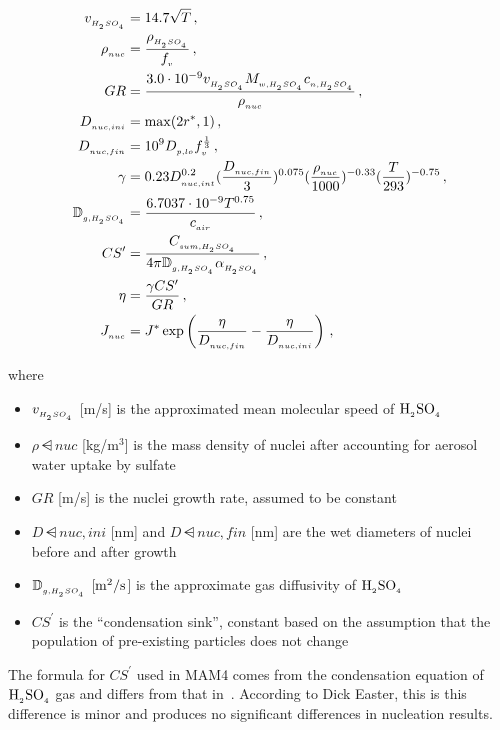 \begin{align}
  v\dsub{\sag} &= 14.7 \sqrt{T} \,, \\
  \rho\dsub{nuc} &= \frac{\rho\dsub{\sag}}{f\dsub{v}} \,, \\
  GR &= \frac{3.0 \cdot 10^{-9} v\dsub{\sag} \mw{\sag} c\dsub{n,\sag}}
        {\rho\dsub{nuc}} \,, \\
  D\dsub{nuc,ini} &= \max (2r^*, 1) \,, \\
  D\dsub{nuc,fin} &= 10^9 D\dsub{p,lo} f\dsub{v}^{\frac{1}{3}} \,, \\
  \gamma &= 0.23 D\dsub{nuc,int}^{0.2}
                 (\frac{D\dsub{nuc,fin}}{3})^{0.075}
                 (\frac{\rho\dsub{nuc}}{1000})^{-0.33}
                 (\frac{T}{293})^{-0.75} \,, \labeleq{nuc:gamma} \\
  \mathbb{D}\dsub{g,\sag} &= \frac{6.7037 \cdot 10^{-9} T^{0.75}}
                             {c\dsub{air}} \,, \\
  CS^\prime &= \frac{C\dsub{sum,\sag}}
               {4 \pi \mathbb{D}\dsub{g,\sag} \alpha\dsub{\sag}} \,, \label{eq:cs_prime} \\
  \eta &= \frac{\gamma CS^\prime}{GR} \,, \\
  J\dsub{nuc} &= J^* \exp \left( \frac{\eta}{D\dsub{nuc,fin}} -
                     \frac{\eta}{D\dsub{nuc,ini}} \right) \,,
\end{align}

where
\begin{itemize}
  \item $v_{_{H_{_2}SO_{_4}}}$ [m/s] is the approximated mean molecular speed of $\rm H_{_2}SO_{_4}$
  \item $\rho\dsub{nuc}$ [kg/m$^3$] is the mass density of nuclei after
        accounting for aerosol water uptake by sulfate
  \item $GR$ [m/s] is the nuclei growth rate, assumed to be constant
  \item $D\dsub{nuc,ini}$ [nm] and $D\dsub{nuc,fin}$ [nm] are the wet diameters
        of nuclei before and after growth
  \item $\mathbb{D}_{_{g,H_{_2}SO_{_4}}}$ [$\rm m^2/s$] is the approximate gas
        diffusivity of $\rm H_{_2}SO_{_4}$
  \item $CS^\prime$ is the ``condensation sink'', constant based on the
        assumption that the population of pre-existing particles does not
        change
\end{itemize}

The formula for $CS^\prime$ used in MAM4 comes from the condensation equation of
$\rm H_{_2}SO_{_4}$ gas and differs from that in~\cite{kerminen-2002-jas}. According to Dick
Easter, this is this difference is minor and produces no significant differences
in nucleation results.

